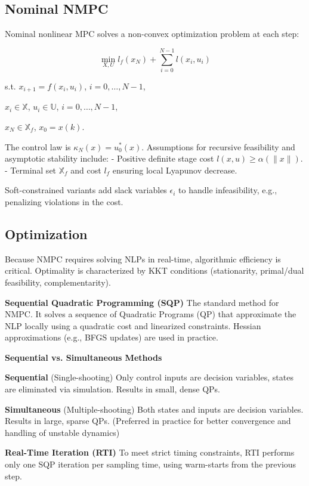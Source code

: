 \subsection{Nominal NMPC}

Nominal nonlinear MPC solves a non-convex optimization problem at each step:

\[
  \min_{X,U} l_f(x_N) + \sum_{i=0}^{N-1} l(x_i, u_i)
\]

s.t. $x_{i+1} = f(x_i, u_i)$, $i=0,\dots,N-1$,

$x_i \in \mathbb{X}$, $u_i \in \mathbb{U}$, $i=0,\dots,N-1$,

$x_N \in \mathbb{X}_f$, $x_0 = x(k)$.

The control law is $\kappa_N(x) = u_0^*(x)$. Assumptions for
recursive feasibility and asymptotic stability include:
- Positive definite stage cost $l(x,u) \ge \alpha(\|x\|)$.
- Terminal set $\mathbb{X}_f$ and cost $l_f$ ensuring local Lyapunov decrease.

Soft-constrained variants add slack variables $\epsilon_i$ to handle
infeasibility, e.g., penalizing violations in the cost.

\subsection{Optimization}

Because NMPC requires solving NLPs in real-time, algorithmic
efficiency is critical. Optimality is characterized by KKT conditions
(stationarity, primal/dual feasibility, complementarity).

\textbf{Sequential Quadratic Programming (SQP)}
The standard method for NMPC.
It solves a sequence of Quadratic Programs (QP)
that approximate the NLP locally using
a quadratic cost and linearized constraints. Hessian approximations
(e.g., BFGS updates) are used in practice.

\textbf{Sequential vs. Simultaneous Methods}

\textbf{Sequential} (Single-shooting)
Only control inputs are decision variables,
states are eliminated via simulation.
Results in small, dense QPs.

\textbf{Simultaneous} (Multiple-shooting)
Both states and inputs are decision variables.
Results in large, sparse QPs.
(Preferred in practice for better convergence
and handling of unstable dynamics)

\textbf{Real-Time Iteration (RTI)}
To meet strict timing constraints, RTI performs only one SQP
iteration per sampling time, using warm-starts from the previous step.

